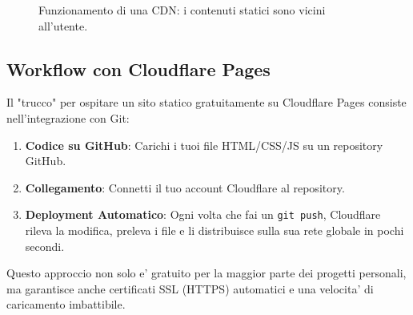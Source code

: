 \documentclass[11pt,a4paper]{report}
\begin{document}
\begin{figure}[ht]
\centering
{}
\caption{Funzionamento di una CDN: i contenuti statici sono vicini all'utente.}
\label{fig:cdn_working}
\end{figure}

\subsection{Workflow con Cloudflare Pages}
Il "trucco" per ospitare un sito statico gratuitamente su Cloudflare Pages consiste nell'integrazione con Git:
\begin{enumerate}
    \item \textbf{Codice su GitHub}: Carichi i tuoi file HTML/CSS/JS su un repository GitHub.
    \item \textbf{Collegamento}: Connetti il tuo account Cloudflare al repository.
    \item \textbf{Deployment Automatico}: Ogni volta che fai un \texttt{git push}, Cloudflare rileva la modifica, preleva i file e li distribuisce sulla sua rete globale in pochi secondi.
\end{enumerate}

Questo approccio non solo e' gratuito per la maggior parte dei progetti personali, ma garantisce anche certificati SSL (HTTPS) automatici e una velocita' di caricamento imbattibile.
\end{document}
